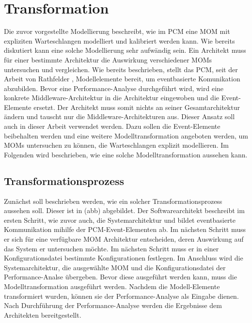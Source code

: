 
\chapter{Transformation}
\label{ch:transformation}
Die zuvor vorgestellte Modellierung beschreibt, wie im PCM eine MOM mit expliziten Warteschlangen modelliert und kalibriert werden kann. Wie bereits diskutiert kann eine solche Modellierung sehr aufwändig sein. Ein Architekt muss für einer bestimmte Architektur die Auswirkung verschiedener MOMs untersuchen und vergleichen. Wie bereits beschrieben, stellt das PCM, seit der Arbeit von Rathfelder \cite{Rathfelder2013}, Modellelemente bereit, um eventbasierte Komunikation abzubilden. Bevor eine Performance-Analyse durchgeführt wird, wird eine konkrete Middleware-Architektur in die Architektur eingewoben und die Event-Elemente ersetzt. Der Architekt muss somit nichts an seiner Gesamtarchitektur ändern und tauscht nur die Middleware-Architekturen aus. Dieser Ansatz soll auch in dieser Arbeit verwendet werden. Dazu sollen die Event-Elemente beibehalten werden und eine weitere Modelltransformation angeboten werden, um MOMs untersuchen zu können, die Warteschlangen explizit modellieren. Im Folgenden wird beschrieben, wie eine solche Modelltransformation aussehen kann.
\section{Transformationsprozess}
Zunächst soll beschrieben werden, wie ein solcher Transformationsprozess aussehen soll. Dieser ist in (abb) abgebildet. Der Softwarearchitekt beschreibt im ersten Schritt, wie zuvor auch, die Systemarchitektur und bildet eventbasierte Kommunikation mihilfe der PCM-Event-Elementen ab. Im nächsten Schritt muss er sich für eine verfügbare MOM Architektur entscheiden, deren Auswirkung auf das System er untersuchen möchte. Im nächsten Schritt muss er in einer Konfigurationsdatei bestimmte Konfigurationen festlegen. Im Anschluss wird die Systemarchitektur, die ausgewählte MOM und die Konfigurationsdatei der Performance-Analse übergeben. Bevor diese ausgeführt werden kann, muss die Modelltransformation ausgeführt werden. Nachdem die Modell-Elemente transformiert wurden, können sie der Performance-Analyse als Eingabe dienen. Nach Durchführung der Performance-Analyse werden die Ergebnisse dem Architekten bereitgestellt.


